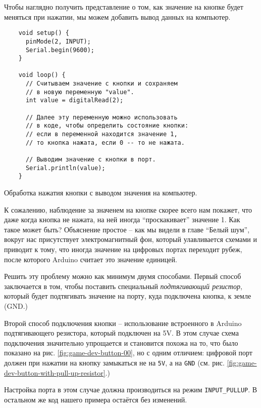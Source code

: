 \documentclass[../sparc.tex]{subfiles}
\begin{document}
Чтобы наглядно получить представление о том, как значение на кнопке будет
меняться при нажатии, мы можем добавить вывод данных на компьютер.

\begin{listing}[H]
  \begin{verbatim}
    void setup() {
      pinMode(2, INPUT);
      Serial.begin(9600);
    }

    void loop() {
      // Считываем значение с кнопки и сохраняем
      // в новую переменную "value".
      int value = digitalRead(2);

      // Далее эту переменную можно использовать
      // в коде, чтобы определить состояние кнопки:
      // если в переменной находится значение 1,
      // то кнопка нажата, если 0 -- то не нажата.

      // Выводим значение с кнопки в порт.
      Serial.println(value);
    }
  \end{verbatim}
  \caption{Обработка нажатия кнопки с выводом значения на компьютер.}
  \label{listing:button-01}
\end{listing}

К сожалению, наблюдение за значенем на кнопке скорее всего нам покажет, что даже
когда кнопка не нажата, на ней иногда ``проскакивает'' значение 1.  Как такое
может быть?  Объяснение простое -- как мы видели в главе ``Белый шум'', вокруг
нас присутствует электромагнитный фон, который улавливается схемами и приводит к
тому, что иногда значение на цифровых портах переходит рубеж, после которого
Arduino считает это значение единицей.

Решить эту проблему можно как минимум двумя способами.  Первый способ
заключается в том, чтобы поставить специальный \emph{подтягивающий резистор},
который будет подтягивать значение на порту, куда подключена кнопка, к земле
(GND.)


Второй способ подключения кнопки -- использование встроенного в Arduino
подтягивающего резистора, который подключен на 5V.  В этом случае схема
подключения значительно упрощается и становится похожа на то, что было показано
на рис. \ref{fig:game-dev-button-00}, но с одним отличием: цифровой порт должен
при нажатии на кнопку замыкаться не на \texttt{5V}, а на \texttt{GND}
(см. рис. \ref{fig:game-dev-button-with-pull-up-resistor}.)


Настройка порта в этом случае должна производиться на режим
\texttt{INPUT\_PULLUP}.  В остальном же код нашего примера остаётся без
изменений.
\end{document}
